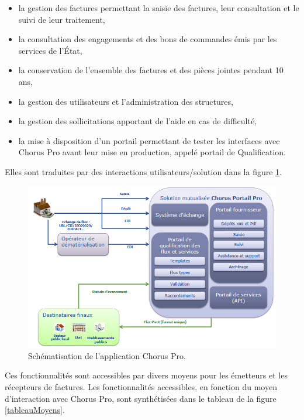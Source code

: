 \documentclass[12pt,a4paper]{article}
\begin{document}
\smallbreak
\begin{itemize}
\item la gestion des factures permettant la saisie des factures, leur consultation et le suivi de leur traitement,
\item la consultation des engagements et des bons de commandes émis par les
services de l’État,
\item la conservation de l’ensemble des factures et des pièces jointes pendant 10 ans,
\item la gestion des utilisateurs et l'administration des structures,
\item la gestion des sollicitations apportant de l'aide en cas de difficulté,
\item la mise à disposition d'un portail permettant de tester les interfaces avec Chorus Pro avant leur mise en production, appelé portail de Qualification.
\end{itemize}
\medbreak
Elles sont traduites par des interactions utilisateurs/solution dans la figure \ref{schematisation}.
\bigbreak
\begin{figure}[H]
	\begin{center}
		\includegraphics[width=\textwidth,height=\textheight,keepaspectratio]{solutionSimplifiee.png}
		\caption{Schématisation de l'application Chorus Pro.}
		\label{schematisation}
	\end{center}
\end{figure}
\clearpage
\newpage
Ces fonctionnalités sont accessibles par divers moyens pour les émetteurs et les récepteurs de factures. Les fonctionnalités accessibles, en fonction du moyen d'interaction avec Chorus Pro, sont synthétisées dans le tableau de la figure \ref{tableauMoyens}.
\end{document}
